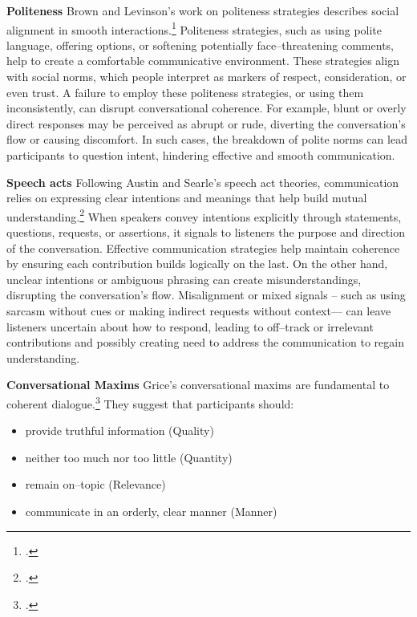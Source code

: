 \documentclass[12pt]{report}
\begin{document}
\par{\textbf{Politeness}
Brown and Levinson’s work on politeness strategies describes social alignment in smooth interactions.\footcite{brown1987politeness}
Politeness strategies, such as using polite language, offering options, or softening potentially face–threatening comments, help to create a comfortable communicative environment. These strategies align with social norms, which people interpret as markers of respect, consideration, or even trust. A failure to employ these politeness strategies, or using them inconsistently, can disrupt conversational coherence. For example, blunt or overly direct responses may be perceived as abrupt or rude, diverting the conversation's flow or causing discomfort. In such cases, the breakdown of polite norms can lead participants to question intent, hindering effective and smooth communication.


\par{\textbf{Speech acts}}
Following Austin and Searle's speech act theories, communication relies on expressing clear intentions and meanings that help build mutual understanding.\footcite{austin1962how,searle1969speech}
 When speakers convey intentions explicitly through statements, questions, requests, or assertions, it signals to listeners the purpose and direction of the conversation. Effective communication strategies help maintain coherence by ensuring each contribution builds logically on the last. On the other hand, unclear intentions or ambiguous phrasing can create misunderstandings, disrupting the conversation's flow. Misalignment or mixed signals – such as using sarcasm without cues or making indirect requests without context— can leave listeners uncertain about how to respond, leading to off–track or irrelevant contributions and possibly creating need to address the communication to regain understanding.

\par{\textbf{Conversational Maxims}}
Grice’s conversational maxims are fundamental to coherent dialogue.\footcite{grice1975logic}
They suggest that participants should:

\begin{itemize}
\item
provide truthful information (Quality)
\item
neither too much nor too little (Quantity)
\item
remain on–topic (Relevance)
\item
communicate in an orderly, clear manner (Manner)
\end{itemize}

}
\end{document}
